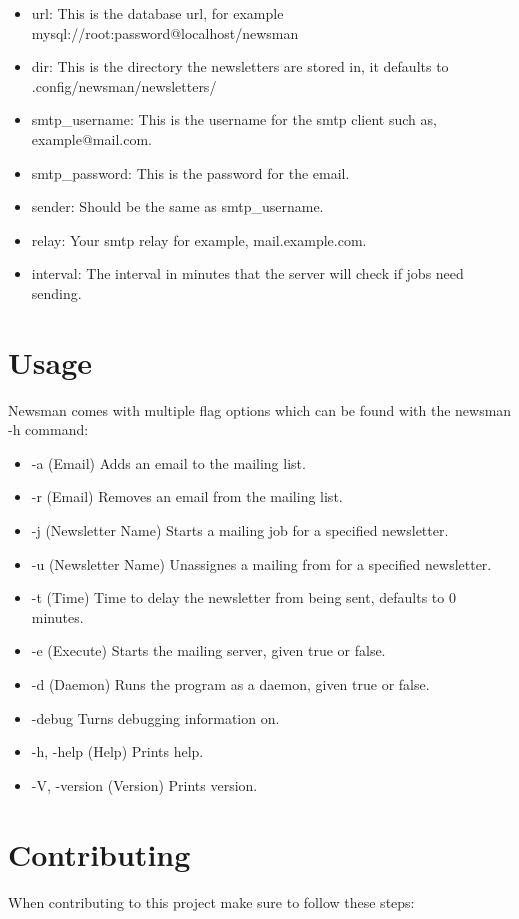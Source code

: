 \documentclass[12pt]{article}
\begin{document}
\begin{itemize}
    \item url: This is the database url, for example 
        mysql://root:password@localhost/newsman 
    \item dir: This is the directory the newsletters are stored in,
        it defaults to .config/newsman/newsletters/
    \item smtp\_username: This is the username for the smtp client such as, 
        example@mail.com.
    \item smtp\_password: This is the password for the email.
    \item sender: Should be the same as smtp\_username.
    \item relay: Your smtp relay for example, mail.example.com.
    \item interval: The interval in minutes that the server will check if jobs 
        need sending.
\end{itemize}

\section{Usage}
Newsman comes with multiple flag options which can be found with the newsman -h 
command:

\begin{itemize}
    \item -a (Email) Adds an email to the mailing list.
    \item -r (Email) Removes an email from the mailing list.
    \item -j (Newsletter Name) Starts a mailing job for a specified newsletter. 
    \item -u (Newsletter Name) Unassignes a mailing from for a specified newsletter.
    \item -t (Time) Time to delay the newsletter from being sent, defaults to 
        0 minutes.
    \item -e (Execute) Starts the mailing server, given true or false.
    \item -d (Daemon) Runs the program as a daemon, given true or false. 
    \item -\-debug Turns debugging information on.
    \item -h, -\-help (Help) Prints help.
    \item -V, -\-version (Version) Prints version.
\end{itemize}

\section{Contributing}
When contributing to this project make sure to follow these steps:
\end{document}
